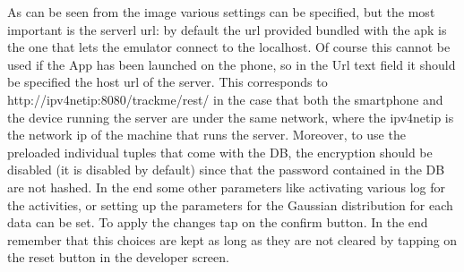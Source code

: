 As can be seen from the image various settings can be specified, but the most important is the serverl url: by default the url provided bundled with the apk is the one that lets the emulator connect to the localhost. Of course this cannot be used if the App has been launched on the phone, so in the Url text field it should be specified the host url of the server. This corresponds  to http://ipv4netip:8080/trackme/rest/ in the case that both the smartphone and the device running the server are under the same network, where the ipv4netip is the network ip of the machine that runs the server.
Moreover, to use the preloaded individual tuples that come with the DB, the encryption should be disabled (it is disabled by default) since that the password contained in the DB are not hashed.
In the end some other parameters like activating various log for the activities, or setting up the parameters for the Gaussian distribution for each data can be set.
To apply the changes tap on the confirm button.
In the end remember that this choices are kept as long as they are not cleared by tapping on the reset button in the developer screen.



